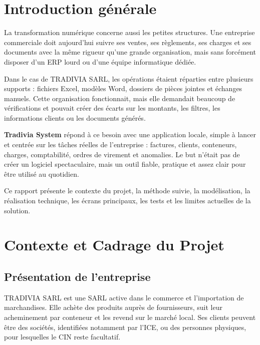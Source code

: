\documentclass[12pt,a4paper,oneside]{report}
\newcommand{\Entreprise}{TRADIVIA SARL}
\begin{document}
\chapter*{Introduction générale}
La transformation numérique concerne aussi les petites structures. Une entreprise commerciale doit aujourd'hui suivre ses ventes, ses règlements, ses charges et ses documents avec la même rigueur qu'une grande organisation, mais sans forcément disposer d'un ERP lourd ou d'une équipe informatique dédiée.

Dans le cas de \Entreprise, les opérations étaient réparties entre plusieurs supports : fichiers Excel, modèles Word, dossiers de pièces jointes et échanges manuels. Cette organisation fonctionnait, mais elle demandait beaucoup de vérifications et pouvait créer des écarts sur les montants, les filtres, les informations clients ou les documents générés.

\textbf{Tradivia System} répond à ce besoin avec une application locale, simple à lancer et centrée sur les tâches réelles de l'entreprise : factures, clients, conteneurs, charges, comptabilité, ordres de virement et anomalies. Le but n'était pas de créer un logiciel spectaculaire, mais un outil fiable, pratique et assez clair pour être utilisé au quotidien.

Ce rapport présente le contexte du projet, la méthode suivie, la modélisation, la réalisation technique, les écrans principaux, les tests et les limites actuelles de la solution.

\chapter{Contexte et Cadrage du Projet}
\section{Présentation de l'entreprise}
\Entreprise{} est une SARL active dans le commerce et l'importation de marchandises. Elle achète des produits auprès de fournisseurs, suit leur acheminement par conteneur et les revend sur le marché local. Ses clients peuvent être des sociétés, identifiées notamment par l'ICE, ou des personnes physiques, pour lesquelles le CIN reste facultatif.
\end{document}
